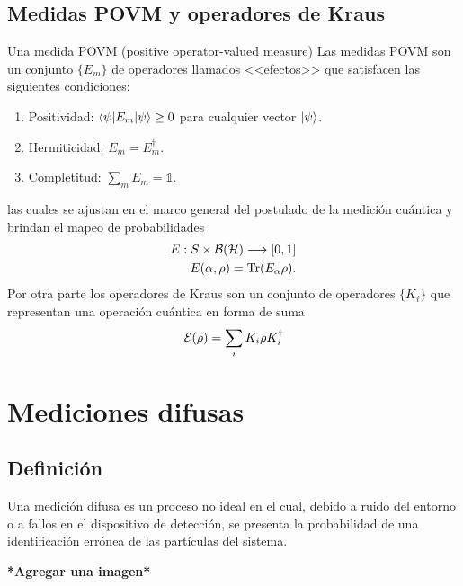 \documentclass[12pt,letterpaper]{book}\raggedbottom{}
\begin{document}
\subsection{Medidas POVM y operadores de Kraus}
\begin{definition} Una medida POVM (positive operator-valued measure) 
Las medidas POVM son  un conjunto $\{E_{m}\}$ de operadores llamados <<efectos>> que satisfacen las siguientes condiciones:
\begin{enumerate}
    \item Positividad: $\langle \psi |E_m|\psi \rangle \ge 0 $ para cualquier vector $|\psi\rangle$.
    \item Hermiticidad: $E_m=E_{m}^\dagger$.
    \item  Completitud: $\sum_m E_m =\mathds{1}$.
\end{enumerate}
\end{definition}

las cuales se ajustan en el marco general del postulado de la medición cuántica y brindan el mapeo de probabilidades \begin{equation}\begin{split}
    E:S\times \mathcal{B(H)}\longrightarrow [0,1]\\
    E(\alpha,\rho)={\rm Tr}(E_\alpha\rho).
\end{split}\end{equation}Por otra parte los operadores de Kraus son un conjunto de operadores $\{K_i\} $ que representan una operación cuántica en forma de suma \begin{equation}
    \mathcal{E}(\rho)=\sum_i K_i\rho K_i^\dagger 
\end{equation}


\section{Mediciones difusas}
\subsection{Definición}
\begin{definition}\label{def:medicion-difusa}Una medición difusa es un proceso no ideal en el cual, debido a ruido del entorno o a fallos en el dispositivo de detección, se presenta la probabilidad de una identificación errónea de las partículas del sistema.
\end{definition}

\textbf{*Agregar una imagen* }
\end{document}

